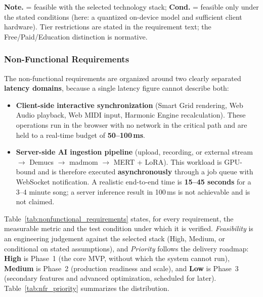 \documentclass[a4paper]{article}
\newcommand{\cmark}{\ding{51}}
\begin{document}
\noindent\footnotesize\textbf{Note.} \cmark{} = feasible with the selected technology stack; \textbf{Cond.} = feasible only under the stated conditions (here: a quantized on-device model and sufficient client hardware). Tier restrictions are stated in the requirement text; the Free/Paid/Education distinction is normative.\normalsize

\subsubsection{Non-Functional Requirements}

The non-functional requirements are organized around two clearly separated \textbf{latency domains}, because a single latency figure cannot describe both:

\begin{itemize}
    \item \textbf{Client-side interactive synchronization} (Smart Grid rendering, Web Audio playback, Web MIDI input, Harmonic Engine recalculation). These operations run in the browser with no network in the critical path and are held to a real-time budget of \textbf{50--100\,ms}.
    \item \textbf{Server-side AI ingestion pipeline} (upload, recording, or external stream $\to$ Demucs $\to$ madmom $\to$ MERT + LoRA). This workload is GPU-bound and is therefore executed \textbf{asynchronously} through a job queue with WebSocket notification. A realistic end-to-end time is \textbf{15--45 seconds} for a 3--4 minute song; a server inference result in 100\,ms is not achievable and is not claimed.
\end{itemize}

Table~\ref{tab:nonfunctional_requirements} states, for every requirement, the measurable metric and the test condition under which it is verified. \emph{Feasibility} is an engineering judgement against the selected stack (High, Medium, or conditional on stated assumptions), and \emph{Priority} follows the delivery roadmap: \textbf{High} is Phase~1 (the core MVP, without which the system cannot run), \textbf{Medium} is Phase~2 (production readiness and scale), and \textbf{Low} is Phase~3 (secondary features and advanced optimization, scheduled for later). Table~\ref{tab:nfr_priority} summarizes the distribution.
\end{document}
